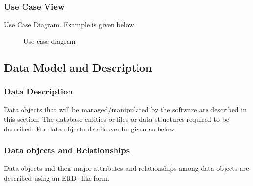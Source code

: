 \documentclass[12pt,a4paper]{article}
\begin{document}
\subsubsection{Use Case View}
Use Case Diagram. Example is given below
\begin{center}
	\begin{figure}[!htbp]
		\centering
	  \caption{Use case diagram}
	  \label{fig:usecase}
	\end{figure}
\end{center}  

\subsection{Data Model and Description}  
\subsubsection{Data Description}  
Data objects that will be managed/manipulated by the software are described in this section. The database entities or files or data structures  required to be described. For data objects details can be given as below
\subsubsection{Data objects and Relationships}
  Data objects and their major attributes and relationships among data objects are described using an ERD- like form.
\end{document}
